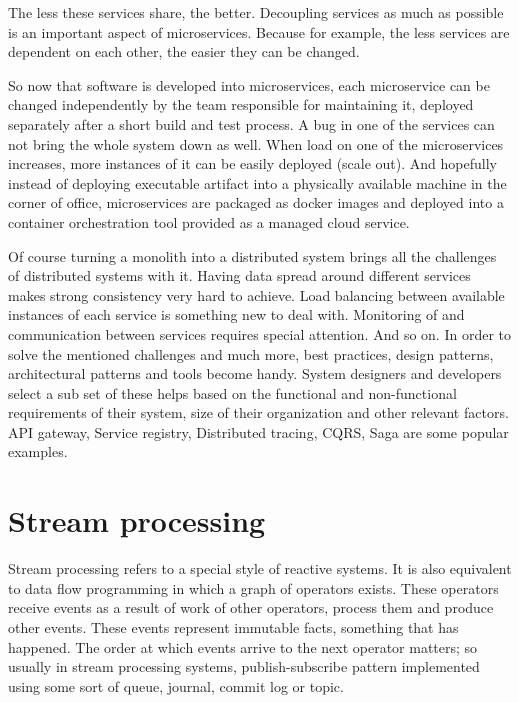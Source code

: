 \documentclass[a4]{report}
\begin{document}
    The less these services share, the better.
    Decoupling services as much as possible is an important aspect of microservices.
    Because for example, the less services are dependent on each other, the easier they can be changed.

    So now that software is developed into microservices, each microservice can be changed independently by the
    team responsible for maintaining it, deployed separately after a short build and test process.
    A bug in one of the services can not bring the whole system down as well.
    When load on one of the microservices increases, more instances of it can be easily deployed (scale out).
    And hopefully instead of deploying executable artifact into a physically available machine in the corner of
    office, microservices are packaged as docker images and deployed into a container orchestration tool provided as
    a managed cloud service.

    Of course turning a monolith into a distributed system brings all the challenges of distributed systems with it.
    Having data spread around different services makes strong consistency very hard to achieve.
    Load balancing between available instances of each service is something new to deal with.
    Monitoring of and communication between services requires special attention.
    And so on.
    In order to solve the mentioned challenges and much more, best practices, design patterns, architectural patterns
    and tools become handy.
    System designers and developers select a sub set of these helps based on the functional and non-functional
    requirements of their system, size of their organization and other relevant factors.
    API gateway, Service registry, Distributed tracing, CQRS, Saga are some popular examples.
    \cite{microservice-architecture} \cite{microservices-pitfalls} \cite{microservices}

    \section{Stream processing}
    Stream processing refers to a special style of reactive systems.
    It is also equivalent to data flow programming in which a graph of operators exists.
    These operators receive events as a result of work of other operators, process them and produce other events.
    These events represent immutable facts, something that has happened.
    The order at which events arrive to the next operator matters;
    so usually in stream processing systems, publish-subscribe pattern implemented using some sort of queue,
    journal, commit log or topic.
    \cite{flink} \cite{fast-data-archs}
\end{document}
